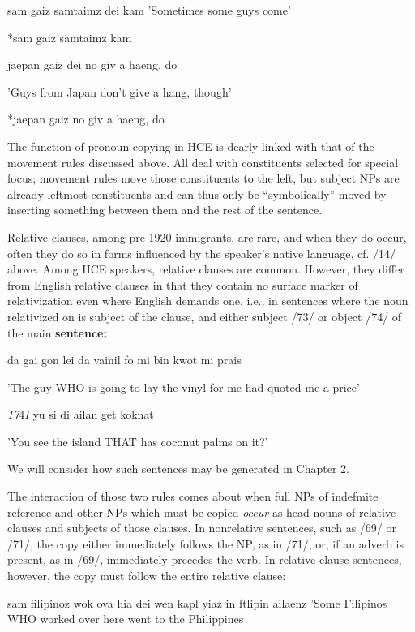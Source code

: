 \ea\label{ex:69}
 sam gaiz samtaimz dei kam 'Sometimes some guys come'
\glt
\z

\ea\label{ex:70}
 *sam gaiz samtaimz kam
\glt
\z

\ea\label{ex:71}
 jaepan gaiz dei no giv a haeng, do
\glt
\z

'Guys from Japan don't give a hang, though'

\ea\label{ex:72}
 *jaepan gaiz no giv a haeng, do
\glt
\z

The function of pronoun-copying in HCE is dearly linked with that of the movement rules discussed above. All deal with constituents selected for special focus; movement rules move those constituents to the left, but subject NPs are already leftmost constituents and can thus only be ``symbolically'' moved by inserting something between them and the rest of the sentence.

Relative clauses, among pre-1920 immigrants, are rare, and when they do occur, often they do so in forms influenced by the speaker's native language, cf. /14/ above. Among HCE speakers, relative clauses are common. However, they differ from English relative clauses in that they contain no surface marker of relativization even where English demands one, i.e., in sentences where the noun relativized on is sub\-ject of the clause, and either subject /73/ or object /74/ of the main \textbf{sentence:} 

\ea\label{ex:73}
 da gai gon lei da vainil fo mi bin kwot mi prais
\glt
\z

'The guy WHO is going to lay the vinyl for me had quoted me a price'

\textit{17}4\textit{I }yu si di ailan get koknat

'You see the island THAT has coconut palms on it?'

We will consider how such sentences may be generated in Chapter 2.

The interaction of those two rules comes about when full NPs of indefmite reference and other NPs which must be copied \textit{occur }as head nouns of relative clauses and subjects of those clauses. In non\-relative sentences, such as /69/ or /71/, the copy either immediately follows the NP, as in /71/, or, if an adverb is present, as in /69/, immediately precedes the verb. In relative-clause sentences, however, the copy must follow the entire relative clause:

\ea\label{ex:75}
 sam filipinoz wok ova hia dei wen kapl yiaz in ftlipin ailaenz 'Some Filipinos WHO worked over here went to the Philippines
\glt
\z

